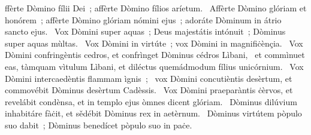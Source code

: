 { }
{%
ffèrte Dòmino fílii Dei~; affèrte Dòmino fílios aríetum. 
~Affèrte Dòmino glóriam et honórem~; affèrte Dòmino glóriam nómini ejus~; adoráte Dòminum in átrio sancto ejus. 
~Vox Dòmini super aquas~; Deus majestátis intónuit~; Dòminus super aquas mùltas. 
~Vox Dòmini in virtúte~; vox Dòmini in magnifiċènçia. 
~Vox Dòmini confringèntis cedros, et confrìnget Dòminus cédros Lìbani, 
~et commìnuet eas, tàmquam vìtulum Lìbani, et diléctus quemádmodum fílius unicórnium. 
~Vox Dòmini intercaedèntis flammam ìgnis~; 
~vox Dòmini concutièntis desèrtum, et commovébit Dòminus desèrtum Cadèssis. 
~Vox Dòmini praeparàntis ċèrvos, et revelábit condènsa, et in templo ejus òmnes dicent glóriam. 
~Dòminus dilúvium inhabitáre fàċit, et sědébit Dòminus rex in aetèrnum. 
~Dòminus virtútem pòpulo suo dabit~; Dòminus benedícet pòpulo suo in paċe. 
}
